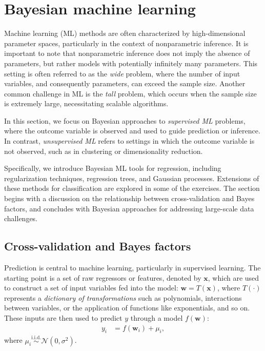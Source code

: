 \chapter{Bayesian machine learning}\label{chap13}

Machine learning (ML) methods are often characterized by high-dimensional parameter spaces, particularly in the context of nonparametric inference. It is important to note that nonparametric inference does not imply the absence of parameters, but rather models with potentially infinitely many parameters. This setting is often referred to as the \textit{wide} problem, where the number of input variables, and consequently parameters, can exceed the sample size. Another common challenge in ML is the \textit{tall} problem, which occurs when the sample size is extremely large, necessitating scalable algorithms.

In this section, we focus on Bayesian approaches to \textit{supervised ML} problems, where the outcome variable is observed and used to guide prediction or inference. In contrast, \textit{unsupervised ML} refers to settings in which the outcome variable is not observed, such as in clustering or dimensionality reduction.

Specifically, we introduce Bayesian ML tools for regression, including regularization techniques, regression trees, and Gaussian processes. Extensions of these methods for classification are explored in some of the exercises. The section begins with a discussion on the relationship between cross-validation and Bayes factors, and concludes with Bayesian approaches for addressing large-scale data challenges.

\section{Cross-validation and Bayes factors}\label{sec13_1}
Prediction is central to machine learning, particularly in supervised learning. The starting point is a set of raw regressors or features, denoted by \( \mathbf{x} \), which are used to construct a set of input variables fed into the model: \( \mathbf{w} = T(\mathbf{x}) \), where \( T(\cdot) \) represents a \textit{dictionary of transformations} such as polynomials, interactions between variables, or the application of functions like exponentials, and so on. These inputs are then used to predict \( y \) through a model \( f(\mathbf{w}) \):
\begin{align*}
	y_i &= f(\mathbf{w}_i) + \mu_i,
\end{align*}
where \( \mu_i \stackrel{\text{i.i.d.}}{\sim} \mathcal{N}(0, \sigma^2) \).


